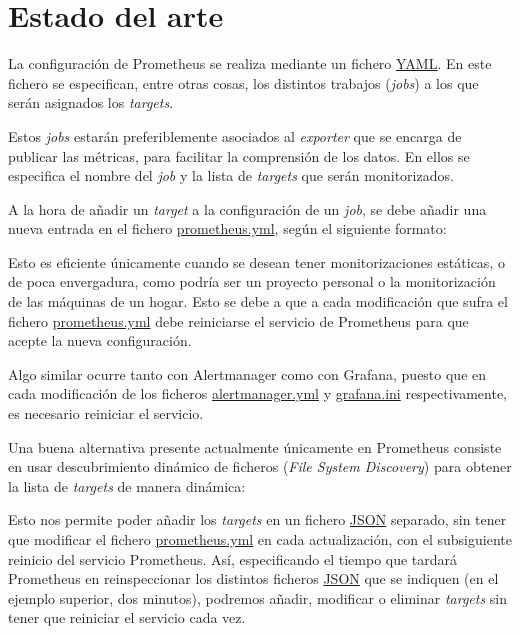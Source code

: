
\section{Estado del arte}

La configuración de Prometheus se realiza mediante un fichero \url{YAML}. En este fichero se especifican, entre otras cosas, los distintos trabajos (\textit{jobs}) a los que serán asignados los \textit{targets}. 

Estos \textit{jobs} estarán preferiblemente asociados al \textit{exporter} que se encarga de publicar las métricas, para facilitar la comprensión de los datos. En ellos se especifica el nombre del \textit{job} y la lista de \textit{targets} que serán monitorizados.

A la hora de añadir un \textit{target} a la configuración de un \textit{job}, se debe añadir una nueva entrada en el fichero \url{prometheus.yml}, según el siguiente formato:



Esto es eficiente únicamente cuando se desean tener monitorizaciones estáticas, o de poca envergadura, como podría ser un proyecto personal o la monitorización de las máquinas de un hogar. Esto se debe a que a cada modificación que sufra el fichero \url{prometheus.yml} debe reiniciarse el servicio de Prometheus para que acepte la nueva configuración.

Algo similar ocurre tanto con Alertmanager como con Grafana, puesto que en cada modificación de los ficheros \url{alertmanager.yml} y \url{grafana.ini} respectivamente, es necesario reiniciar el servicio.

Una buena alternativa presente actualmente únicamente en Prometheus consiste en usar descubrimiento dinámico de ficheros (\textit{File System Discovery}) para obtener la lista de	\textit{targets} de manera dinámica:



Esto nos permite poder añadir los \textit{targets} en un fichero \url{JSON} separado, sin tener que modificar el fichero \url{prometheus.yml} en cada actualización, con el subsiguiente reinicio del servicio Prometheus. Así, especificando el tiempo que tardará Prometheus en reinspeccionar los distintos ficheros \url{JSON} que se indiquen (en el ejemplo superior, dos minutos), podremos añadir, modificar o eliminar	\textit{targets} sin tener que reiniciar el servicio cada vez.

